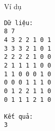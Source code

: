 Ví dụ
\begin{verbatim}
Dữ liệu:
8 7
4 3 2 2 1 0 1
3 3 3 2 1 0 1
2 2 2 2 1 0 0
2 1 1 1 1 0 0
1 1 0 0 0 1 0
0 0 0 1 1 1 0
0 1 2 2 1 1 0
0 1 1 1 2 1 0

Kết quả:
3
\end{verbatim}